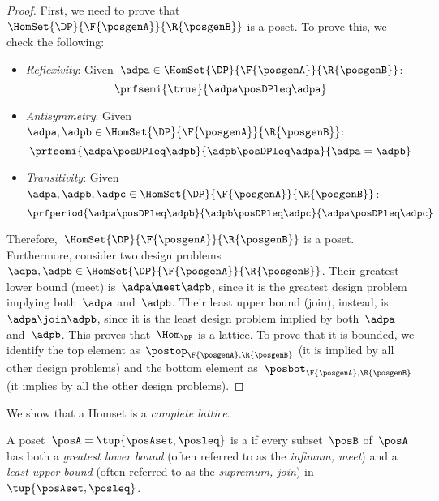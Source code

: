 \begin{proof}
	First, we need to prove that~$\HomSet{\DP}{\F{\posgenA}}{\R{\posgenB}}$ is a poset.
	To prove this, we check the following:
	\begin{itemize}
		\item \emph{Reflexivity}: Given~$\adpa\in \HomSet{\DP}{\F{\posgenA}}{\R{\posgenB}}$:
		      \begin{equation*}
			      \prfsemi{
				      \true
			      }{
				      \adpa\posDPleq \adpa
			      }
		      \end{equation*}
		\item \emph{Antisymmetry}: Given~$\adpa,\adpb\in \HomSet{\DP}{\F{\posgenA}}{\R{\posgenB}}$:
		      \begin{equation*}
			      \prfsemi{
				      \adpa\posDPleq \adpb
			      }{
				      \adpb\posDPleq \adpa
			      }{
				      \adpa=\adpb
			      }
		      \end{equation*}
		\item \emph{Transitivity}: Given~$\adpa,\adpb,\adpc\in \HomSet{\DP}{\F{\posgenA}}{\R{\posgenB}}$:
		      \begin{equation*}
			      \prfperiod{
				      \adpa\posDPleq \adpb
			      }{
				      \adpb\posDPleq \adpc
			      }{
				      \adpa \posDPleq \adpc
			      }
		      \end{equation*}
	\end{itemize}
	Therefore,~$\HomSet{\DP}{\F{\posgenA}}{\R{\posgenB}}$ is a poset.
	Furthermore, consider two design problems~$\adpa,\adpb\in \HomSet{\DP}{\F{\posgenA}}{\R{\posgenB}}$.
	Their greatest lower bound (meet) is~$\adpa\meet\adpb$, since it is the greatest design problem implying both~$\adpa$ and~$\adpb$.
	Their least upper bound (join), instead, is~$\adpa\join \adpb$, since it is the least design problem implied by both~$\adpa$ and~$\adpb$.
	This proves that~$\Hom_\DP$ is a lattice.
	To prove that it is bounded, we identify the top element as~$\postop_{\F{\posgenA},\R{\posgenB}}$ (it is implied by all other design problems) and the bottom element as~$\posbot_{\F{\posgenA},\R{\posgenB}}$ (it implies by all the other design problems).
\end{proof}

We show that a \DP Homset is a \emph{complete lattice}.

\begin{definition}
	\label{def:complete-lattice}
	A poset~$\posA=\tup{\posAset,\posleq}$ is a \emph{} if every subset~$\posB$ of~$\posA$ has both a \emph{greatest lower bound} (often referred to as the \emph{infimum, meet}) and a \emph{least upper bound} (often referred to as the \emph{supremum, join}) in~$\tup{\posAset, \posleq}$.
\end{definition}

